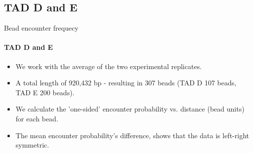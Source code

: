 \documentclass[8pt]{beamer}
\begin{document}
\subsection{TAD D and E}\label{subsection_tadDAndE}
\begin{frame}{Bead encounter frequecy}
\framesubtitle{TAD D and E}
\begin{itemize}
\item We work with the average of the two experimental replicates.
\item A total length of 920,432 bp - resulting in 307 beads (TAD D 107 beads, TAD E 200 beads).
\item We calculate the 'one-sided' encounter probability vs. distance (bead units) for each bead.
\item The mean encounter probability's difference, shows that the data is left-right symmetric.


\end{itemize}
\end{frame}
\end{document}
